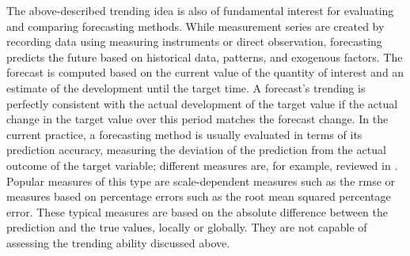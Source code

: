 The above-described trending idea is also of fundamental interest for evaluating and comparing forecasting methods. 
While measurement series are created by recording data using measuring instruments or direct observation, forecasting predicts the future based on historical data, patterns, and exogenous factors. 
The forecast is computed based on the current value of the quantity of interest and an estimate of the development until the target time.
A forecast's trending is perfectly consistent with the actual development of the target value if the actual change in the target value over this period matches the forecast change. 
In the current practice, a forecasting method is usually evaluated in terms of its prediction accuracy, measuring the deviation of the prediction from the actual outcome of the target variable; different measures are, for example, reviewed in \parencite{hyndman2006another}. 
Popular measures of this type are scale-dependent measures such as the \ac{rmse} or measures based on percentage errors such as the root mean squared percentage error. 
These typical measures are based on the absolute difference between the prediction and the true values, locally or globally. 
They are not capable of assessing the trending ability discussed above.

